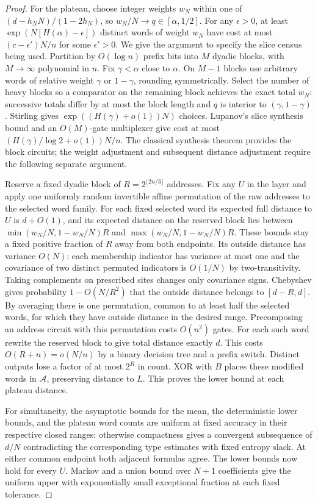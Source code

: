 \begin{proof}
For the plateau, choose integer weights \(w_N\) within one of
\((d-h_NN)/(1-2h_N)\), so \(w_N/N\to q\in[\alpha,1/2]\).
For any \(\epsilon>0\), at least \(\exp(N[H(\alpha)-\epsilon])\) distinct words of weight \(w_N\) have cost at most \((c-\epsilon')N/n\) for some \(\epsilon'>0\). We give the argument to specify the slice census being used. Partition by \(O(\log n)\) prefix bits into \(M\) dyadic blocks, with \(M\to\infty\) polynomial in \(n\). Fix \(\gamma<\alpha\) close to \(\alpha\). On \(M-1\) blocks use arbitrary words of relative weight \(\gamma\) or \(1-\gamma\), rounding symmetrically. Select the number of heavy blocks so a comparator on the remaining block achieves the exact total \(w_N\): successive totals differ by at most the block length and \(q\) is interior to \((\gamma,1-\gamma)\). Stirling gives \(\exp((H(\gamma)+o(1))N)\) choices. Lupanov's slice synthesis bound \cite{lup,kors} and an \(O(M)\)-gate multiplexer give cost at most \((H(\gamma)/\log2+o(1))N/n\). The classical synthesis theorem provides the block circuits; the weight adjustment and subsequent distance adjustment require the following separate argument.

Reserve a fixed dyadic block of \(R=2^{\lfloor 2n/3\rfloor}\) addresses. Fix any \(U\) in the layer and apply one uniformly random invertible affine permutation of the raw addresses to the selected word family. For each fixed selected word its expected full distance to \(U\) is \(d+O(1)\), and its expected distance on the reserved block lies between \(\min(w_N/N,1-w_N/N)R\) and \(\max(w_N/N,1-w_N/N)R\). These bounds stay a fixed positive fraction of \(R\) away from both endpoints. Its outside distance has variance \(O(N)\): each membership indicator has variance at most one and the covariance of two distinct permuted indicators is \(O(1/N)\) by two-transitivity. Taking complements on prescribed sites changes only covariance signs. Chebyshev gives probability \(1-O(N/R^2)\) that the outside distance belongs to \([d-R,d]\). By averaging there is one permutation, common to at least half the selected words, for which they have outside distance in the desired range. Precomposing an address circuit with this permutation costs \(O(n^2)\) gates. For each such word rewrite the reserved block to give total distance exactly \(d\). This costs \(O(R+n)=o(N/n)\) by a binary decision tree and a prefix switch. Distinct outputs lose a factor of at most \(2^R\) in count. XOR with \(B\) places these modified words in \(\mathcal A\), preserving distance to \(L\). This proves the lower bound at each plateau distance.

For simultaneity, the asymptotic bounds for the mean, the deterministic lower bounds, and the plateau word counts are uniform at fixed accuracy in their respective closed ranges: otherwise compactness gives a convergent subsequence of \(d/N\) contradicting the corresponding type estimates with fixed entropy slack. At either common endpoint both adjacent formulas agree. The lower bounds now hold for every \(U\). Markov and a union bound over \(N+1\) coefficients give the uniform upper with exponentially small exceptional fraction at each fixed tolerance.
\end{proof}
